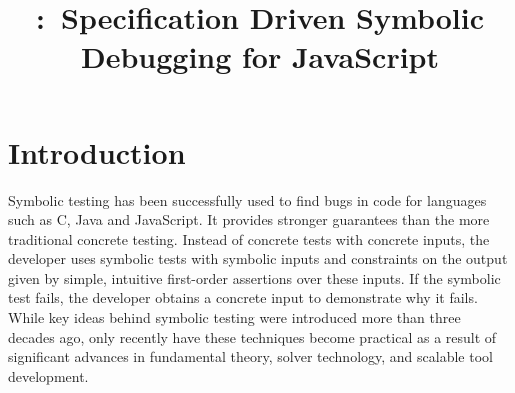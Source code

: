 \documentclass[sigconf, anonymous, review]{acmart}
\title[Short Title]{\cosette:~Specification Driven Symbolic Debugging for JavaScript}
\newif\ifComments
\newcommand{\pg}[1]{%
\ifComments
\begin{center}
\fbox{\begin{minipage}{0.4\textwidth} \color{red}
{\rm PG: \small #1}
\end{minipage}}
\end{center}
\fi}
\newcommand{\pmax}[1]{%
\ifComments
\begin{center}
\fbox{\begin{minipage}{0.4\textwidth} \color{blue}
{\rm PM: \small #1}
\end{minipage}}
\end{center}
\fi}
\begin{document}
%

\maketitle 

\section{Introduction}





\pmax{Many messages, let's not forget any:
\begin{itemize}
\item Methodology for analysis of languages with no frame property
\item Trustworthiness
\item Compositionality
\item Proper description of what we do and not do (soundiness, with or without the term itself) (no eval, for-in with a chosen enumeration)
\item more...?
\end{itemize}
}


Symbolic testing has been successfully used to find bugs in code for 
languages such as C, Java and JavaScript.  
It provides stronger guarantees than the more 
traditional concrete testing.
Instead of concrete tests with concrete inputs, the developer uses
symbolic tests with symbolic inputs and constraints on the output
given by simple, intuitive  first-order assertions over
these inputs. If the symbolic test fails, the developer obtains a
concrete input 
to demonstrate why it fails. 
While key ideas behind symbolic testing  were introduced more than
three decades ago, only recently have these techniques become
practical as a result of significant advances in fundamental theory,
solver technology, and scalable tool development.


\end{document}

